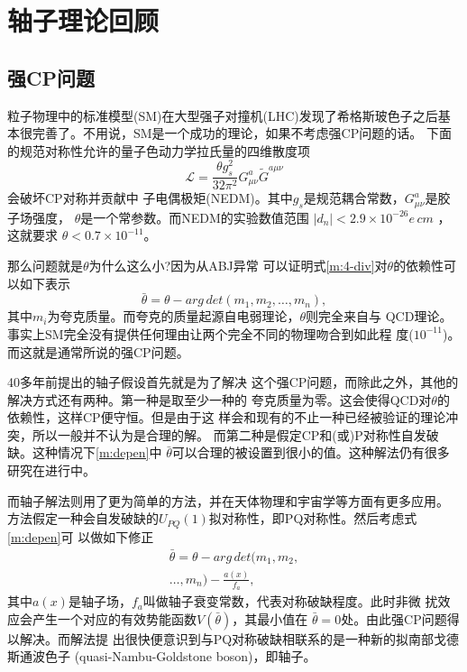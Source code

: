 \documentclass[twocolumn,12pt,a4paper]{article}
\begin{document}
\section{轴子理论回顾}
\subsection{强CP问题}
粒子物理中的标准模型(SM)在大型强子对撞机(LHC)发现了希格斯玻色子之后基
本很完善了。不用说，SM是一个成功的理论，如果不考虑强CP问题的话。
下面的规范对称性允许的量子色动力学拉氏量的四维散度项
\begin{equation}
  \mathcal{L} = \frac{\theta g_s^2}{32\pi^2}G_{\mu\nu}^a\tilde{G}^{a\mu\nu}
  \label{m:4-div}
\end{equation}
会破坏CP对称并贡献中
子电偶极矩(NEDM)。其中$g_s$是规范耦合常数，$G_{\mu\nu}^a$是胶子场强度，
$\theta$是一个常参数。而NEDM的实验数值范围
$|d_n|<2.9 \times 10^{-26} e\, cm$ \cite{baker06}，这就要求
$\theta<0.7\times10^{-11}$\cite{kim10}。\par
那么问题就是$\theta$为什么这么小?因为从ABJ异常
\cite{adler69}\cite{bell69}可以证明式\ref{m:4-div}对$\theta$的依赖性可
以如下表示
\begin{equation}
  \bar{\theta} = \theta - arg \, det(m_1,m_2, \ldots, m_n),
  \label{m:depen}
\end{equation}
其中$m_i$为夸克质量。而夸克的质量起源自电弱理论，$\theta$则完全来自与
QCD理论。事实上SM完全没有提供任何理由让两个完全不同的物理吻合到如此程
度($10^{-11}$)。而这就是通常所说的强CP问题。\par
40多年前提出的轴子假设\cite{peccei77a}\cite{peccei77b}首先就是为了解决
这个强CP问题，而除此之外，其他的解决方式还有两种。第一种是取至少一种的
夸克质量为零。这会使得QCD对$\theta$的依赖性，这样CP便守恒。但是由于这
样会和现有的不止一种已经被验证的理论冲突，所以一般并不认为是合理的解。
而第二种是假定CP和(或)P对称性自发破缺。这种情况下\ref{m:depen}中
$\bar{\theta}$可以合理的被设置到很小的值。这种解法仍有很多研究在进行中。\par
而轴子解法则用了更为简单的方法，并在天体物理和宇宙学等方面有更多应用。
方法假定一种会自发破缺的$U_{PQ}(1)$拟对称性，即PQ对称性。然后考虑式\ref{m:depen}可
以做如下修正
\begin{multline}
  \bar{\theta} = \theta - arg \, det(m_1,m_2,\\ \ldots, m_n)- \frac{a(x)}{f_a},
  \label{m:modd}
\end{multline}
其中$a(x)$是轴子场，$f_a$叫做轴子衰变常数，代表对称破缺程度。此时非微
扰效应会产生一个对应的有效势能函数$V(\bar{\theta})$，其最小值在
$\bar{\theta}=0$处\cite{vefa84}。由此强CP问题得以解决。而解法提
出很快便意识到与PQ对称破缺相联系的是一种新的拟南部戈德斯通波色子
(quasi-Nambu-Goldstone boson)，即轴子\cite{weinberg78}\cite{wilczek78}。
\end{document}
